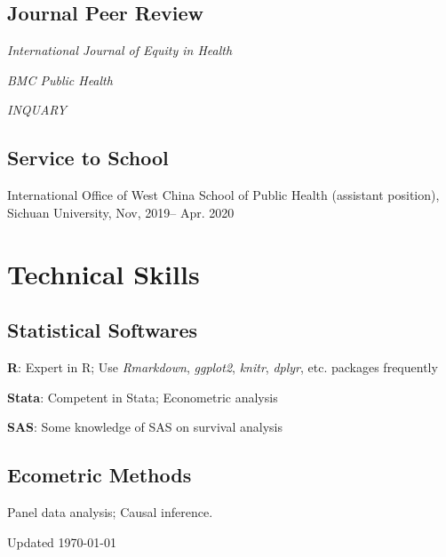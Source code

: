 \documentclass[12pt,letterpaper]{report}
\newcommand{\listitemspace}{0.15em}
\renewenvironment{itemize}
{\begin{list}{}{\setlength{\leftmargin}{0em}
            \setlength{\parskip}{0em}
            \setlength{\itemsep}{\listitemspace}
            \setlength{\parsep}{\listitemspace}}}
    {\end{list}}
\begin{document}
    \subsection*{Journal Peer Review}

    \begin{itemize}
        
        \item \textit{International Journal of Equity in Health}
        \item \textit{BMC Public Health}
        \item  \textit{INQUARY}
       
    \end{itemize}

	
    \subsection*{Service to School}

    \begin{itemize}
    	
    	\item International Office of West China School of Public Health (assistant position), Sichuan University, Nov, 2019-- Apr. 2020
       
    \end{itemize}
	


    \section*{Technical Skills}

    \subsection*{Statistical Softwares}

    \begin{itemize}

        \item \textbf{R}: Expert in R; Use \textit{Rmarkdown}, \textit{ggplot2}, \textit{knitr}, \textit{dplyr}, etc. packages frequently
        \item \textbf{Stata}: Competent in Stata; Econometric analysis
        \item \textbf{SAS}: Some knowledge of SAS on survival analysis

    \end{itemize}
   
    \subsection*{Ecometric Methods}

    \begin{itemize}

        \item Panel data analysis; Causal inference.

    \end{itemize}



    \begin{center}
        \vfill
        Updated \monthyeardate\today
    \end{center}
\end{document}
